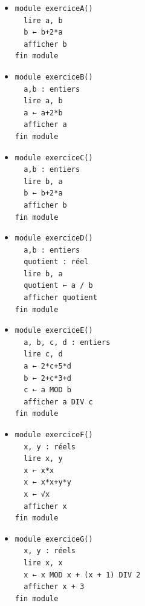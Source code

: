 \documentclass[11pt,a4paper]{article}
\begin{document}
					\begin{itemize}
				
			\item \begin{verbatim}
module exerciceA()
  lire a, b
  b ← b+2*a
  afficher b
fin module
				\end{verbatim} \textcolor{gray}{\underline{\hspace*{1em}}} 
			\item \begin{verbatim}
module exerciceB()
  a,b : entiers
  lire a, b
  a ← a+2*b
  afficher a
fin module
				\end{verbatim} \textcolor{gray}{\underline{\hspace*{1em}}} 
			\item \begin{verbatim}
module exerciceC()
  a,b : entiers
  lire b, a
  b ← b+2*a
  afficher b
fin module
				\end{verbatim} \textcolor{gray}{\underline{\hspace*{1em}}} 
			\item \begin{verbatim}
module exerciceD()
  a,b : entiers
  quotient : réel
  lire b, a
  quotient ← a / b
  afficher quotient
fin module
				\end{verbatim} \textcolor{gray}{\underline{\hspace*{2em}}} 
			\item \begin{verbatim}
module exerciceE()
  a, b, c, d : entiers
  lire c, d
  a ← 2*c+5*d
  b ← 2+c*3+d
  c ← a MOD b
  afficher a DIV c
fin module
				\end{verbatim} \textcolor{gray}{\underline{\hspace*{1em}}} 
			\item \begin{verbatim}
module exerciceF()
  x, y : réels
  lire x, y
  x ← x*x 
  x ← x*x+y*y 
  x ← √x
  afficher x
fin module
				\end{verbatim} \textcolor{gray}{\underline{\hspace*{1em}}} 
			\item \begin{verbatim}
module exerciceG()
  x, y : réels
  lire x, x
  x ← x MOD x + (x + 1) DIV 2
  afficher x + 3
fin module
				\end{verbatim} \textcolor{gray}{\underline{\hspace*{1em}}} 
					\end{itemize}
				
\end{document}
